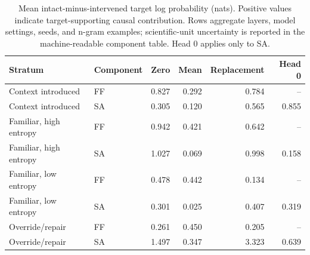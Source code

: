 \begin{table}[H]\centering\small
\begin{tabular}{llrrrr}\toprule
Stratum & Component & Zero & Mean & Replacement & Head 0 \\\midrule
Context introduced & FF & 0.827 & 0.292 & 0.784 & -- \\
Context introduced & SA & 0.305 & 0.120 & 0.565 & 0.855 \\
Familiar, high entropy & FF & 0.942 & 0.421 & 0.642 & -- \\
Familiar, high entropy & SA & 1.027 & 0.069 & 0.998 & 0.158 \\
Familiar, low entropy & FF & 0.478 & 0.442 & 0.134 & -- \\
Familiar, low entropy & SA & 0.301 & 0.025 & 0.407 & 0.319 \\
Override/repair & FF & 0.261 & 0.450 & 0.205 & -- \\
Override/repair & SA & 1.497 & 0.347 & 3.323 & 0.639 \\
\bottomrule\end{tabular}
\caption{Mean intact-minus-intervened target log probability (nats). Positive values indicate target-supporting causal contribution. Rows aggregate layers, model settings, seeds, and n-gram examples; scientific-unit uncertainty is reported in the machine-readable component table. Head 0 applies only to SA.}
\label{tab:pilot-causal}
\end{table}

